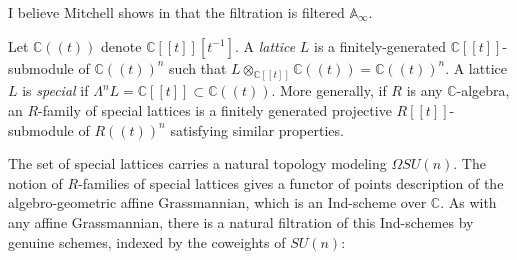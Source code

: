 I believe Mitchell shows in \cite{MitchellSU(n)} that the filtration is filtered $\mathbb{A}_\infty$.


\begin{dfn}
Let $\mathbb{C}((t))$ denote $\mathbb{C}[[t]][t^{-1}]$.  A \textit{lattice} $L$ is a finitely-generated $\mathbb{C}[[t]]$-submodule of $\mathbb{C}((t))^n$ such that $L \otimes_{\mathbb{C}[[t]]} \mathbb{C}((t))=\mathbb{C}((t))^n.$  A lattice $L$ is \textit{special} if $\Lambda^n L = \mathbb{C}[[t]] \subset \mathbb{C}((t))$.  More generally, if $R$ is any $\mathbb{C}$-algebra, an $R$-family of special lattices is a finitely generated projective $R[[t]]$-submodule of $R((t))^n$ satisfying similar properties.
\end{dfn}

The set of special lattices carries a natural topology modeling $\Omega SU(n)$.  The notion of $R$-families of special lattices gives a functor of points description of the algebro-geometric affine Grassmannian, which is an Ind-scheme over $\mathbb{C}$.  As with any affine Grassmannian, there is a natural filtration of this Ind-schemes by genuine schemes, indexed by the coweights of $SU(n)$:

